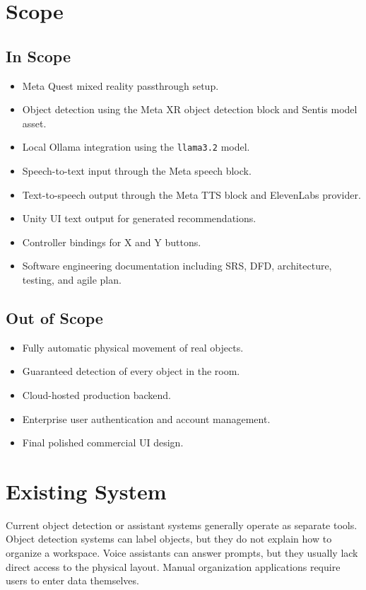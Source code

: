 \documentclass[12pt,a4paper]{article}
\begin{document}
\section{Scope}

\subsection{In Scope}

\begin{itemize}
    \item Meta Quest mixed reality passthrough setup.
    \item Object detection using the Meta XR object detection block and Sentis model asset.
    \item Local Ollama integration using the \texttt{llama3.2} model.
    \item Speech-to-text input through the Meta speech block.
    \item Text-to-speech output through the Meta TTS block and ElevenLabs provider.
    \item Unity UI text output for generated recommendations.
    \item Controller bindings for X and Y buttons.
    \item Software engineering documentation including SRS, DFD, architecture, testing, and agile plan.
\end{itemize}

\subsection{Out of Scope}

\begin{itemize}
    \item Fully automatic physical movement of real objects.
    \item Guaranteed detection of every object in the room.
    \item Cloud-hosted production backend.
    \item Enterprise user authentication and account management.
    \item Final polished commercial UI design.
\end{itemize}

\section{Existing System}

Current object detection or assistant systems generally operate as separate tools. Object detection systems can label objects, but they do not explain how to organize a workspace. Voice assistants can answer prompts, but they usually lack direct access to the physical layout. Manual organization applications require users to enter data themselves.
\end{document}
